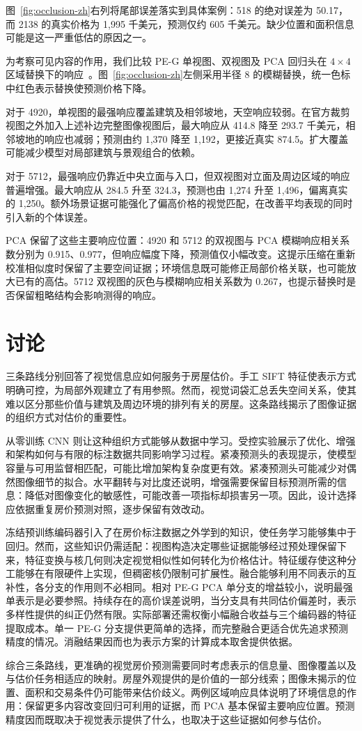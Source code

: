 \documentclass[conference,a4paper]{IEEEtran}
\begin{document}
图~\ref{fig:occlusion-zh}右列将尾部误差落实到具体案例：518 的绝对误差为 50.17，而 2138 的真实价格为 1,995 千美元，预测仅约 605 千美元。缺少位置和面积信息可能是这一严重低估的原因之一。

\begin{samepage}
为考察可见内容的作用，我们比较 PE-G 单视图、双视图及 PCA 回归头在 $4\times4$ 区域替换下的响应~\cite{occlusion}。图~\ref{fig:occlusion-zh}左侧采用半径 8 的模糊替换，统一色标中红色表示替换使预测价格下降。

对于 4920，单视图的最强响应覆盖建筑及相邻坡地，天空响应较弱。在官方裁剪视图之外加入上述补边完整图像视图后，最大响应从 414.8 降至 293.7 千美元，相邻坡地的响应也减弱；预测由约 1,370 降至 1,192，更接近真实 874.5。扩大覆盖可能减少模型对局部建筑与景观组合的依赖。\par
\end{samepage}

对于 5712，最强响应仍靠近中央立面与入口，但双视图对立面及周边区域的响应普遍增强。最大响应从 284.5 升至 324.3，预测也由 1,274 升至 1,496，偏离真实的 1,250。额外场景证据可能强化了偏高价格的视觉匹配，在改善平均表现的同时引入新的个体误差。

PCA 保留了这些主要响应位置：4920 和 5712 的双视图与 PCA 模糊响应相关系数分别为 0.915、0.977，但响应幅度下降，预测值仅小幅改变。这提示压缩在重新校准相似度时保留了主要空间证据；环境信息既可能修正局部价格关联，也可能放大已有的高估。5712 双视图的灰色与模糊响应相关系数为 0.267，也提示替换时是否保留粗略结构会影响测得的响应。

\section{讨论}
三条路线分别回答了视觉信息应如何服务于房屋估价。手工 SIFT 特征使表示方式明确可控，为局部外观建立了有用参照。然而，视觉词袋汇总丢失空间关系，使其难以区分那些价值与建筑及周边环境的排列有关的房屋。这条路线揭示了图像证据的组织方式对估价的重要性。

从零训练 CNN 则让这种组织方式能够从数据中学习。受控实验展示了优化、增强和架构如何与有限的标注数据共同影响学习过程。紧凑预测头的表现提示，使模型容量与可用监督相匹配，可能比增加架构复杂度更有效。紧凑预测头可能减少对偶然图像细节的拟合。水平翻转与对比度还说明，增强需要保留目标预测所需的信息：降低对图像变化的敏感性，可能改善一项指标却损害另一项。因此，设计选择应依据重复房价预测对照，逐步保留有效改动。

冻结预训练编码器引入了在房价标注数据之外学到的知识，使任务学习能够集中于回归。然而，这些知识仍需适配：视图构造决定哪些证据能够经过预处理保留下来，特征变换与核几何则决定视觉相似性如何转化为价格估计。特征缓存使这种分工能够在有限硬件上实现，但稠密核仍限制可扩展性。融合能够利用不同表示的互补性，各分支的作用则不必相同。相对 PE-G PCA 单分支的增益较小，说明最强单表示是必要参照。持续存在的高价误差说明，当分支具有共同估价偏差时，表示多样性提供的纠正仍然有限。实际部署还需权衡小幅融合收益与三个编码器的特征提取成本。单一 PE-G 分支提供更简单的选择，而完整融合更适合优先追求预测精度的情况。消融结果因而也为表示方案的计算成本取舍提供依据。

综合三条路线，更准确的视觉房价预测需要同时考虑表示的信息量、图像覆盖以及与估价任务相适应的映射。房屋外观提供的是价值的一部分线索；图像未揭示的位置、面积和交易条件仍可能带来估价歧义。两例区域响应具体说明了环境信息的作用：保留更多内容改变回归可利用的证据，而 PCA 基本保留主要响应位置。预测精度因而既取决于视觉表示提供了什么，也取决于这些证据如何参与估价。



\end{document}
